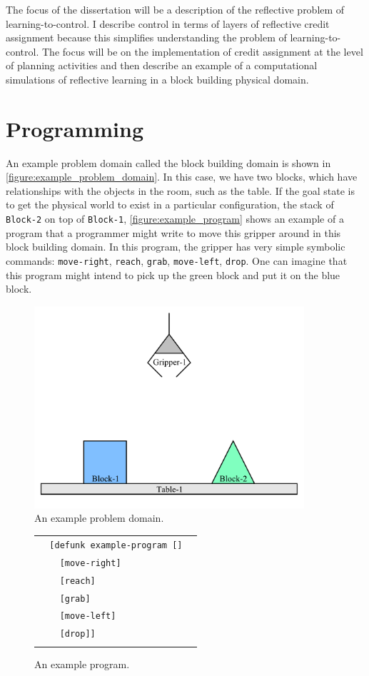 The focus of the dissertation will be a description of the reflective
problem of learning-to-control.  I describe control in terms of layers
of reflective credit assignment because this simplifies understanding
the problem of learning-to-control.  The focus will be on the
implementation of credit assignment at the level of planning
activities and then describe an example of a computational simulations
of reflective learning in a block building physical domain.

\section{Programming}

An example problem domain called the block building domain is shown in
{\mbox{\autoref{figure:example_problem_domain}}}.  In this case, we
have two blocks, which have relationships with the objects in the
room, such as the table.  If the goal state is to get the physical
world to exist in a particular configuration, the stack of {\tt
  Block-2} on top of {\tt Block-1},
{\mbox{\autoref{figure:example_program}}} shows an example of a
program that a programmer might write to move this gripper around in
this block building domain.  In this program, the gripper has very
simple symbolic commands: {\tt move-right}, {\tt reach}, {\tt grab},
{\tt move-left}, {\tt drop}.  One can imagine that this program might
intend to pick up the green block and put it on the blue block.
\begin{figure}
\center
\includegraphics[width=10cm]{gfx/blocks_world_example-1}
\caption{An example problem domain.}
\label{figure:example_problem_domain}
\end{figure}
\begin{figure}
\center
\begin{tabular}{l}
\\
  {\tt ~~[defunk example-program []}~~ \\
  {\tt ~~~~[move-right]} ~~\\
  {\tt ~~~~[reach]} ~~\\
  {\tt ~~~~[grab]} ~~\\
  {\tt ~~~~[move-left]} ~~\\
  {\tt ~~~~[drop]]} ~~\\
\\
\end{tabular}
\caption{An example program.}
\label{figure:example_program}
\end{figure}

